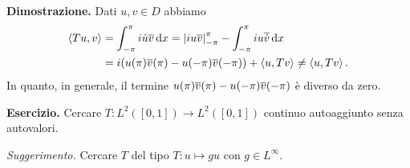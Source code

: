 \textbf{Dimostrazione.} Dati $u,v \in D$ abbiamo
\begin{align*}
	\left<Tu,v \right> & = \int_{-\pi}^{\pi} i \dot u \overline{v} \,\mathrm{d} x  = \left| i u \overline{v} \right|_{-\pi}^\pi - \int_{-\pi}^\pi i u \overline{\dot v} \,\mathrm{d} x \\
	& = i (u(\pi) \overline{v}(\pi) - u(- \pi) \overline{v}(-\pi)) + \left<u, Tv \right> \neq \left<u, Tv \right>.
\end{align*}
In quanto, in generale, il termine $u(\pi) \overline{v}(\pi) - u(- \pi) \overline{v}(-\pi)$ è diverso da zero.


\textbf{Esercizio.} Cercare $T \colon L^2([0,1]) \to L^2([0,1])$ continuo autoaggiunto senza autovalori.

\textit{Suggerimento.} Cercare $T$ del tipo $T \colon u \mapsto gu$ con $g \in L^\infty$.
